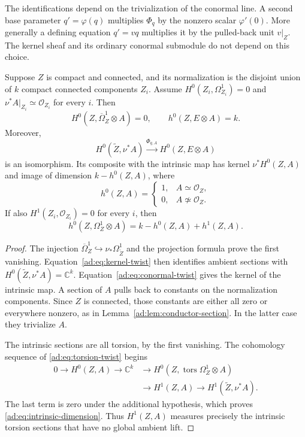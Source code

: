 \documentclass[11pt]{article}
\numberwithin{equation}{section}
\begin{document}
The identifications depend on the trivialization of the conormal
line. A second base parameter $q'=\varphi(q)$ multiplies $\Phi_q$
by the nonzero scalar $\varphi'(0)$. More generally a defining
equation $q'=v q$ multiplies it by the pulled-back unit $v|_Z$.
The kernel sheaf and its ordinary conormal submodule do not depend
on this choice.

\begin{corollary}\label{ad:cor:exact-dimensions}
Suppose $Z$ is compact and connected, and its normalization is the
disjoint union of $k$ compact connected components $Z_i$.
Assume $H^0(Z_i,\Omega_{Z_i}^1)=0$ and $\nu^*A|_{Z_i}\simeq\mathcal O_{Z_i}$
for every $i$. Then
\[
 H^0(Z,\overline\Omega_Z^1\otimes A)=0,
 \qquad h^0(Z,E\otimes A)=k.
\]
Moreover,
\[
 H^0(\widetilde Z,\nu^*A)\xrightarrow{\Phi_{q,A}}
 H^0(Z,E\otimes A)
\]
is an isomorphism. Its composite with the intrinsic
map has kernel $\nu^*H^0(Z,A)$ and image of dimension
$k-h^0(Z,A)$, where
\[
 h^0(Z,A)=
 \begin{cases}1,&A\simeq\mathcal O_Z,\\0,&A\not\simeq\mathcal O_Z.\end{cases}
\]
If also $H^1(Z_i,\mathcal O_{Z_i})=0$ for every $i$, then
\begin{equation}\label{ad:eq:intrinsic-dimension}
 h^0(Z,\Omega_Z^1\otimes A)
   =k-h^0(Z,A)+h^1(Z,A).
\end{equation}
\end{corollary}

\begin{proof}
The injection
$\overline\Omega_Z^1\hookrightarrow\nu_*\Omega_{\widetilde Z}^1$
and the projection formula prove the first vanishing.
Equation~\eqref{ad:eq:kernel-twist} then identifies ambient sections
with $H^0(\widetilde Z,\nu^*A)=\mathbb C^k$.
Equation~\eqref{ad:eq:conormal-twist} gives the kernel of the
intrinsic map. A section of $A$ pulls back to constants on the
normalization components. Since $Z$ is connected, those constants
are either all zero or everywhere nonzero, as in
Lemma~\ref{ad:lem:conductor-section}. In the latter case they
trivialize $A$.

The intrinsic sections are all torsion, by the first vanishing.
The cohomology sequence of \eqref{ad:eq:torsion-twist} begins
\[
 \begin{aligned}
 0\longrightarrow H^0(Z,A)\longrightarrow\mathbb C^k
 &\longrightarrow H^0(Z,\operatorname{tors}\Omega_Z^1\otimes A)\\
 &\longrightarrow H^1(Z,A)
 \longrightarrow H^1(\widetilde Z,\nu^*A).
 \end{aligned}
\]
The last term is zero under the additional hypothesis, which proves
\eqref{ad:eq:intrinsic-dimension}. Thus $H^1(Z,A)$ measures precisely
the intrinsic torsion sections that have no global ambient lift.
\end{proof}
\end{document}
